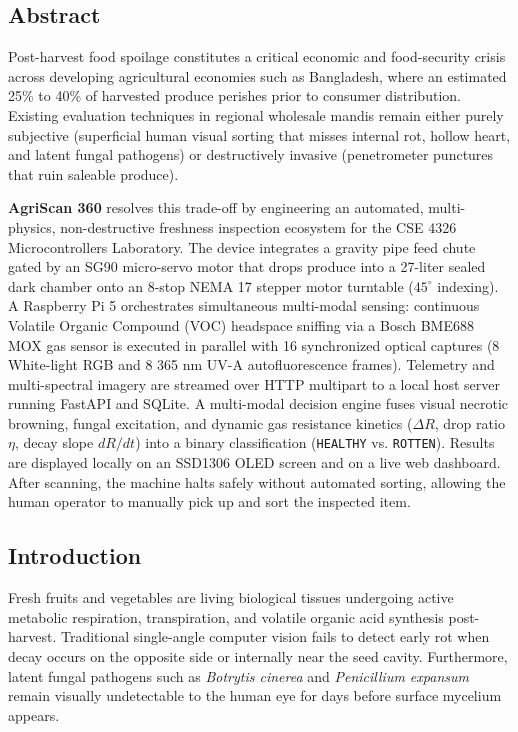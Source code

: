 \documentclass[11pt,a4paper]{article}
\begin{document}
\subsection{Abstract}
Post-harvest food spoilage constitutes a critical economic and food-security crisis across developing agricultural economies such as Bangladesh, where an estimated 25\% to 40\% of harvested produce perishes prior to consumer distribution. Existing evaluation techniques in regional wholesale mandis remain either purely subjective (superficial human visual sorting that misses internal rot, hollow heart, and latent fungal pathogens) or destructively invasive (penetrometer punctures that ruin saleable produce). 

\textbf{AgriScan 360} resolves this trade-off by engineering an automated, multi-physics, non-destructive freshness inspection ecosystem for the CSE 4326 Microcontrollers Laboratory. The device integrates a gravity pipe feed chute gated by an SG90 micro-servo motor that drops produce into a 27-liter sealed dark chamber onto an 8-stop NEMA 17 stepper motor turntable ($45^\circ$ indexing). A Raspberry Pi 5 orchestrates simultaneous multi-modal sensing: continuous Volatile Organic Compound (VOC) headspace sniffing via a Bosch BME688 MOX gas sensor is executed in parallel with 16 synchronized optical captures (8 White-light RGB and 8 365 nm UV-A autofluorescence frames). Telemetry and multi-spectral imagery are streamed over HTTP multipart to a local host server running FastAPI and SQLite. A multi-modal decision engine fuses visual necrotic browning, fungal excitation, and dynamic gas resistance kinetics ($\Delta R$, drop ratio $\eta$, decay slope $dR/dt$) into a binary classification (\texttt{HEALTHY} vs. \texttt{ROTTEN}). Results are displayed locally on an SSD1306 OLED screen and on a live web dashboard. After scanning, the machine halts safely without automated sorting, allowing the human operator to manually pick up and sort the inspected item.

\subsection{Introduction}
Fresh fruits and vegetables are living biological tissues undergoing active metabolic respiration, transpiration, and volatile organic acid synthesis post-harvest. Traditional single-angle computer vision fails to detect early rot when decay occurs on the opposite side or internally near the seed cavity. Furthermore, latent fungal pathogens such as \textit{Botrytis cinerea} and \textit{Penicillium expansum} remain visually undetectable to the human eye for days before surface mycelium appears.
\end{document}
